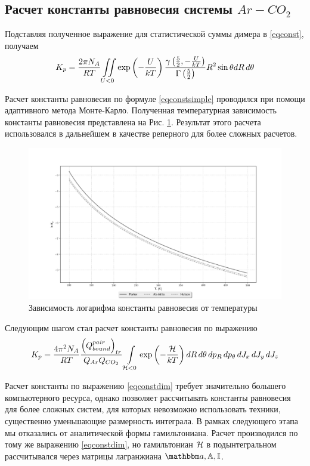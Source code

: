 \subsection{Расчет константы равновесия системы $Ar-CO_2$}

Подставляя полученное выражение для статистической суммы димера в \eqref{eqconst}, получаем
\vverh
\begin{gather}
	K_p = \frac{2 \pi N_A}{R T} \iint\limits_{U < 0} \exp \left( - \frac{U}{k T} \right) \frac{\gamma \left( \frac{5}{2}, - \frac{U}{kT} \right)}{\Gamma \left( \frac{5}{2} \right)} R^2 \sin \theta d R \, d \theta \label{eqconstsimple}
\end{gather}

Расчет константы равновесия по формуле \eqref{eqconstsimple} проводился при помощи адаптивного метода Монте-Карло. Полученная температурная зависимость константы равновесия представлена на  Рис. \ref{fig:pic3}. Результат этого расчета использовался в дальнейшем в качестве реперного для более сложных расчетов. 
\vverh
\begin{figure}[!ht]
	\hspace*{-1.2cm}
	\includegraphics[width=1.1\textwidth]{pictures/all_eq_const.png}
	\caption{Зависимость логарифма константы равновесия от температуры}
	\label{fig:pic3}
\end{figure}

Следующим шагом стал расчет константы равновесия по выражению
\vverh
\begin{gather}
	K_p = \frac{4 \pi^2 N_A}{RT} \frac{ \left( Q_{bound}^{pair} \right)_{tr}}{Q_{Ar} Q_{CO_2}} \int\limits_{\mathcal{H} < 0} \exp \left( - \frac{\mathcal{H}}{k T} \right) d R \, d \theta \, d p_R \, d p_\theta \, d J_x \, d J_y \, d J_z \label{eqconstdim} 
\end{gather}

Расчет константы по выражению \eqref{eqconstdim} требует значительно большего компьютерного ресурса, однако позволяет рассчитывать константы равновесия для более сложных систем, для которых невозможно использовать техники, существенно уменьшающие размерность интеграла. В рамках следующего этапа мы отказались от аналитической формы гамильтониана. Расчет производился по тому же выражению \eqref{eqconstdim}, но гамильтониан $\mathcal{H}$ в подынтегральном рассчитывался через матрицы лагранжиана $\bba, \bbA, \bbI$.

